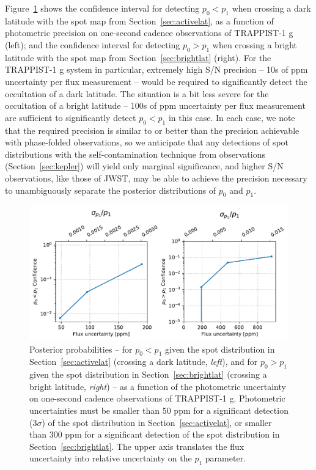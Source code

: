 Figure~\ref{fig:uncertainty} shows the confidence interval for detecting $p_0 < p_1$ when crossing a dark latitude with the spot map from Section~\ref{sec:activelat}, as a function of photometric precision on one-second cadence observations of TRAPPIST-1 g (left); and the confidence interval for detecting $p_0 > p_1$ when crossing a bright latitude with the spot map from Section~\ref{sec:brightlat} (right). For the TRAPPIST-1 g system in particular, extremely high S/N precision -- 10s of ppm uncertainty per flux measurement --  would be required to significantly detect the occultation of a dark latitude. The situation is a bit less severe for the occultation of a bright latitude -- 100s of ppm uncertainty per flux measurement are sufficient to significantly detect $p_0 < p_1$ in this case. In each case, we note that the required precision is similar to or better than the precision achievable with phase-folded \kepler observations, so we anticipate that any detections of spot distributions with the self-contamination technique from \kepler observations (Section~\ref{sec:kepler}) will yield only marginal significance, and higher S/N observations, like those of JWST, may be able to achieve the precision necessary to unambiguously separate the posterior distributions of $p_0$ and $p_1$. 

\begin{figure}
    \centering
    \includegraphics[scale=0.9]{robin/confidence_uncertainty2.pdf}
    \caption{Posterior probabilities -- for $p_0 < p_1$ given the spot distribution in Section~\ref{sec:activelat} (crossing a dark latitude, {\it left}), and for $p_0 > p_1$ given the spot distribution in Section~\ref{sec:brightlat} (crossing a bright latitude, {\it right}) -- as a function of the photometric uncertainty on one-second cadence observations of TRAPPIST-1 g. Photometric uncertainties must be smaller than 50 ppm for a significant detection (3$\sigma$) of the spot distribution in Section~\ref{sec:activelat}, or smaller than 300 ppm for a significant detection of the spot distribution in Section~\ref{sec:brightlat}. The upper axis translates the flux uncertainty into relative uncertainty on the $p_1$ parameter.
    }
    \label{fig:uncertainty}
\end{figure}


